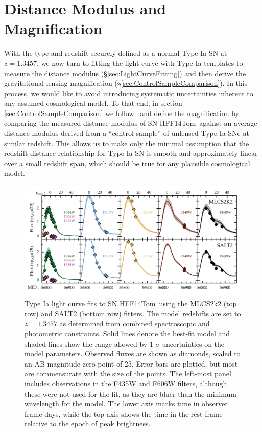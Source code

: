 \documentclass[iop]{emulateapj}
\def\P14{\citetalias{Patel:2014}}
\def\tomas{HFF14Tom}
\begin{document}
\section{Distance Modulus and Magnification}
\label{sec:DistanceAndMagnification}

With the type and redshift securely defined as a normal Type Ia SN at
$z=1.3457$, we now turn to fitting the light curve with Type Ia
templates to measure the distance
modulus (\S\ref{sec:LightCurveFitting}) and then derive the
gravitational lensing
magnification (\S\ref{sec:ControlSampleComparison}).  In this
process, we would like to avoid introducing systematic uncertainties
inherent to any assumed cosmological model.  To that end, in
section \ref{sec:ControlSampleComparison} we
follow \P14\ and define the magnification by comparing
the measured distance modulus of SN \tomas\ against an average
distance modulus derived from a ``control sample'' of unlensed Type Ia
SNe at similar redshift. This allows us to make only the minimal
assumption that the redshift-distance relationship for Type Ia SN is
smooth and approximately linear over a small redshift span, which
should be true for any plausible cosmological model.


\begin{figure}
\begin{center}
\includegraphics[width=\textwidth]{snTomas_lightcurve_fit_fluxAB25}
\caption{ Type Ia light curve fits to SN \tomas\ using the MLCS2k2
(top row) and SALT2 (bottom row) fitters. The model redshifts are set to
$z=1.3457$ as determined from combined
spectroscopic and photometric constraints.  Solid lines denote the
best-fit model and shaded lines show the range allowed by 1-$\sigma$
uncertainties on the model parameters. 
Observed fluxes are shown as diamonds, scaled to an AB magnitude
zero point of 25. Error bars are plotted, but most are commensurate
with the size of the points. The left-most panel includes observations
in the F435W and F606W filters, although these were not used for the
fit, as they are bluer than the minimum wavelength for the model. The
lower axis marks time in observer frame days, while the top axis shows
the time in the rest frame relative to the epoch of peak brightness.
\label{fig:LightCurveFits} }
\end{center}
\end{figure}
\end{document}
